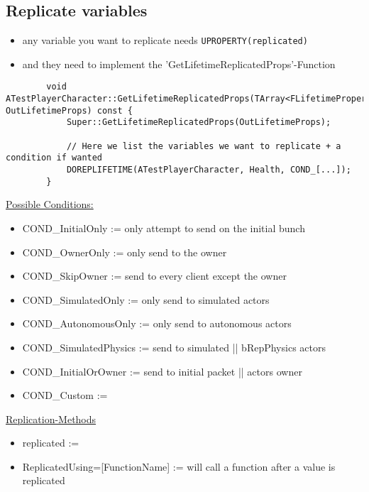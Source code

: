         \subsection{Replicate variables}
            \begin{itemize}
                \item any variable you want to replicate needs \colorbox{mygray}{\lstinline{UPROPERTY(replicated)}} 
                \item and they need to implement the 'GetLifetimeReplicatedProps'-Function
            \end{itemize}
            \begin{lstlisting}
        void ATestPlayerCharacter::GetLifetimeReplicatedProps(TArray<FLifetimeProperty>& OutLifetimeProps) const {
            Super::GetLifetimeReplicatedProps(OutLifetimeProps);

            // Here we list the variables we want to replicate + a condition if wanted
            DOREPLIFETIME(ATestPlayerCharacter, Health, COND_[...]);
        }
            \end{lstlisting}

            \uline{Possible Conditions:}
            \begin{itemize}
                \item COND\_InitialOnly := only attempt to send on the initial bunch
                \item COND\_OwnerOnly := only send to the owner
                \item COND\_SkipOwner := send to every client except the owner
                \item COND\_SimulatedOnly := only send to simulated actors
                \item COND\_AutonomousOnly := only send to autonomous actors
                \item COND\_SimulatedPhysics := send to simulated || bRepPhysics actors
                \item COND\_InitialOrOwner := send to initial packet || actors owner
                \item COND\_Custom := 
            \end{itemize}

            \uline{Replication-Methods}
            \begin{itemize}
                \item replicated := 
                \item ReplicatedUsing=[FunctionName] := will call a function after a value is replicated
            \end{itemize}
            
